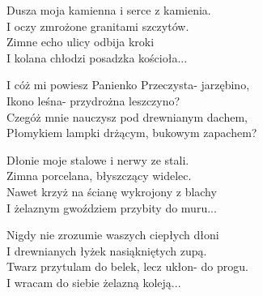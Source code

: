 \begin{text}
Dusza moja kamienna i serce z kamienia.\\
I oczy zmrożone granitami szczytów.\\
Zimne echo ulicy odbija kroki\\
I kolana chłodzi posadzka kościoła...

\vin I cóż mi powiesz Panienko Przeczysta- jarzębino,\\
\vin Ikono leśna- przydrożna leszczyno?\\
\vin Czegóż mnie nauczysz pod drewnianym dachem,\\
\vin Płomykiem lampki drżącym, bukowym zapachem?

Dłonie moje stalowe i nerwy ze stali.\\
Zimna porcelana, błyszczący widelec.\\
Nawet krzyż na ścianę wykrojony z blachy\\
I żelaznym gwoździem przybity do muru...

Nigdy nie zrozumie waszych ciepłych dłoni\\
I drewnianych łyżek nasiąkniętych zupą.\\
Twarz przytulam do belek, lecz ukłon- do progu.\\
I wracam do siebie żelazną koleją...
\end{text}